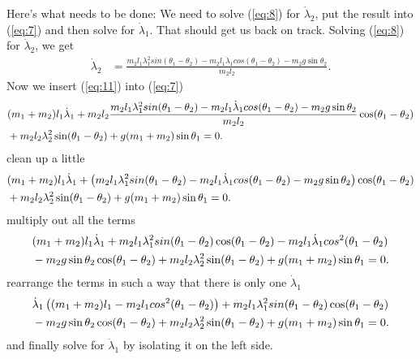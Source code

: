 \documentclass[paper=a4, fontsize=11pt]{scrartcl} %
\numberwithin{equation}{section} %
\numberwithin{figure}{section} %
\numberwithin{table}{section} %
\begin{document}
\vspace{\baselineskip}
Here's what needs to be done: We need to solve (\ref{eq:8}) for $\dot{\lambda}_2$, put the result into (\ref{eq:7}) and then solve for $\dot{\lambda}_1$. That should get us back on track.
Solving (\ref{eq:8}) for $\dot{\lambda}_2$, we get
\begin{align} \label{eq:11}
  \dot{\lambda}_2 &= \frac{m_2 l_1 \lambda^2_1 sin(\theta_1 - \theta_2) - m_2 l_1 \dot{\lambda}_1 cos(\theta_1 - \theta_2) - m_2 g \sin \theta_2}{m_2 l_2}.
\end{align}
Now we insert (\ref{eq:11}) into (\ref{eq:7})
\begin{align} 
  &(m_1 + m_2) l_1 \dot{\lambda}_1 + m_2 l_2 \frac{m_2 l_1 \lambda^2_1 sin(\theta_1 - \theta_2) - m_2 l_1 \dot{\lambda}_1 cos(\theta_1 - \theta_2) - m_2 g \sin \theta_2}{m_2 l_2}\cos(\theta_1 - \theta_2)  \notag \\
  &+ m_2 l_2 \lambda^2_2 \sin(\theta_1 - \theta_2) + g (m_1 + m_2) \sin \theta_1 = 0. \label{eq:12}
\end{align}
clean up a little
\begin{align} 
  &(m_1 + m_2) l_1 \dot{\lambda}_1 + \left( m_2 l_1 \lambda^2_1 sin(\theta_1 - \theta_2) - m_2 l_1 \dot{\lambda}_1 cos(\theta_1 - \theta_2) - m_2 g \sin \theta_2 \right) \cos(\theta_1 - \theta_2)  \notag \\
  &+ m_2 l_2 \lambda^2_2 \sin(\theta_1 - \theta_2) + g (m_1 + m_2) \sin \theta_1 = 0. \label{eq:13}
\end{align}
multiply out all the terms
\begin{align} 
  &(m_1 + m_2) l_1 \dot{\lambda}_1 + m_2 l_1 \lambda^2_1 sin(\theta_1 - \theta_2)\cos(\theta_1 - \theta_2) - m_2 l_1 \dot{\lambda}_1 cos^2(\theta_1 - \theta_2)    \notag \\
  & - m_2 g \sin \theta_2\cos(\theta_1 - \theta_2) + m_2 l_2 \lambda^2_2 \sin(\theta_1 - \theta_2) + g (m_1 + m_2) \sin \theta_1 = 0. \label{eq:14}
\end{align}
rearrange the terms in such a way that there is only one $\dot{\lambda}_1$
\begin{align} 
  &\dot{\lambda}_1 \left((m_1 + m_2) l_1 - m_2 l_1 cos^2(\theta_1 - \theta_2)\right) + m_2 l_1 \lambda^2_1 sin(\theta_1 - \theta_2)\cos(\theta_1 - \theta_2)   \notag \\
  & - m_2 g \sin \theta_2 \cos(\theta_1 - \theta_2) + m_2 l_2 \lambda^2_2 \sin(\theta_1 - \theta_2) + g (m_1 + m_2) \sin \theta_1 = 0. \label{eq:15}
\end{align}
and finally solve for $\dot{\lambda}_1$ by isolating it on the left side.
\end{document}
